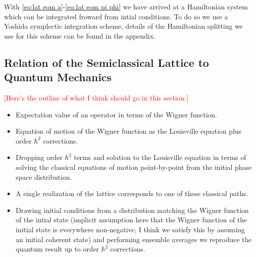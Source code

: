 
With \eqref{eq:lat eom a}-\eqref{eq:lat eom pi phi} we have arrived at a Hamiltonian system which can be integrated froward from intial conditions. To do so we use a Yoshida symplectic integration scheme, details of the Hamiltonian splitting we use for this scheme can be found in the appendix.

\subsection{Relation of the Semiclassical Lattice to Quantum Mechanics}
\textcolor{red}{[Here's the outline of what I think should go in this section:]}
\begin{itemize}
  \color{red}
  \item Expectation value of an operator in terms of the Wigner function.
  \item Equation of motion of the Wigner function as the Louisville equation plus order $\hbar^2$ corrections.
  \item Dropping order $\hbar^2$ terms and solution to the Louisville equation in terms of solving the classical equations of motion point-by-point from the initial phase space distribution.
  \item A single realization of the lattice corresponds to one of these classical paths.
  \item Drawing initial conditions from a distribution matching the Wigner function of the intial state (implicit assumption here that the Wigner function of the initial state is everywhere non-negative, I think we satisfy this by assuming an initial coherent state) and performing ensemble averages we reproduce the quantum result up to order $\hbar^2$ corrections.
\end{itemize}
  
